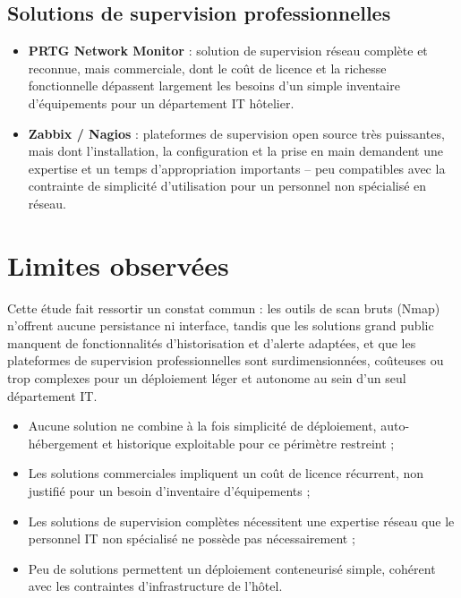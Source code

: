 \subsection{Solutions de supervision professionnelles}
\begin{itemize}
    \item \textbf{PRTG Network Monitor} : solution de supervision réseau complète et
    reconnue, mais commerciale, dont le coût de licence et la richesse fonctionnelle
    dépassent largement les besoins d'un simple inventaire d'équipements pour un
    département IT hôtelier.
    \item \textbf{Zabbix / Nagios} : plateformes de supervision open source très
    puissantes, mais dont l'installation, la configuration et la prise en main
    demandent une expertise et un temps d'appropriation importants -- peu compatibles
    avec la contrainte de simplicité d'utilisation pour un personnel non spécialisé en
    réseau.
\end{itemize}

\section{Limites observées}

Cette étude fait ressortir un constat commun : les outils de scan bruts (Nmap) n'offrent
aucune persistance ni interface, tandis que les solutions grand public manquent de
fonctionnalités d'historisation et d'alerte adaptées, et que les plateformes de
supervision professionnelles sont surdimensionnées, coûteuses ou trop complexes pour un
déploiement léger et autonome au sein d'un seul département IT.

\begin{itemize}
    \item Aucune solution ne combine à la fois simplicité de déploiement,
    auto-hébergement et historique exploitable pour ce périmètre restreint ;
    \item Les solutions commerciales impliquent un coût de licence récurrent, non
    justifié pour un besoin d'inventaire d'équipements ;
    \item Les solutions de supervision complètes nécessitent une expertise réseau que le
    personnel IT non spécialisé ne possède pas nécessairement ;
    \item Peu de solutions permettent un déploiement conteneurisé simple, cohérent avec
    les contraintes d'infrastructure de l'hôtel.
\end{itemize}

